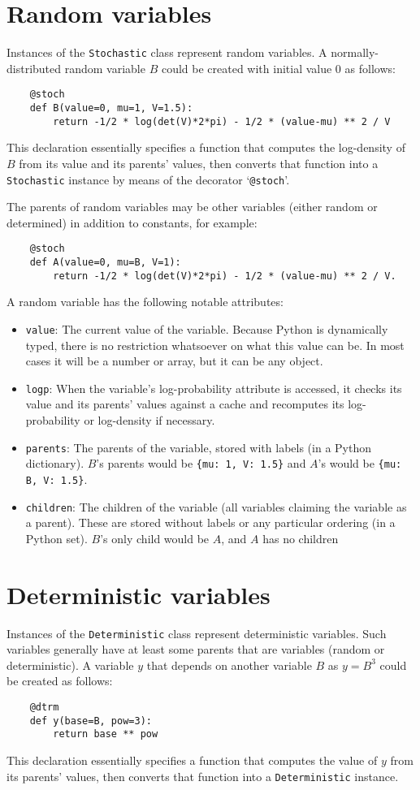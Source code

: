 \documentclass{report}
\begin{document}
\section{Random variables} 
Instances of the \texttt{Stochastic} class represent random variables. A normally-distributed random variable $B$ could be created with initial value 0 as follows:
\begin{verbatim}    
    @stoch
    def B(value=0, mu=1, V=1.5):
        return -1/2 * log(det(V)*2*pi) - 1/2 * (value-mu) ** 2 / V
\end{verbatim}
This declaration essentially specifies a function that computes the log-density of $B$ from its value and its parents' values, then converts that function into a \texttt{Stochastic} instance by means of the decorator `\texttt{@stoch}'.

The parents of random variables may be other variables (either random or determined) in addition to constants, for example:
\begin{verbatim}
    @stoch
    def A(value=0, mu=B, V=1):
        return -1/2 * log(det(V)*2*pi) - 1/2 * (value-mu) ** 2 / V.
\end{verbatim}


A random variable has the following notable attributes: 
\begin{itemize}
    \item \texttt{value}: The current value of the variable. Because Python is dynamically typed, there is no restriction whatsoever on what this value can be. In most cases it will be a number or array, but it can be any object.
    \item \texttt{logp}: When the variable's log-probability attribute is accessed, it checks its value and its parents' values against a cache and recomputes its log-probability or log-density if necessary.
    \item \texttt{parents}: The parents of the variable, stored with labels (in a Python dictionary). $B$'s parents would be \texttt{\{mu: 1, V: 1.5\}} and $A$'s would be \texttt{\{mu: B, V: 1.5\}}.
    \item \texttt{children}: The children of the variable (all variables claiming the variable as a parent). These are stored without labels or any particular ordering (in a Python set). $B$'s only child would be $A$, and $A$ has no children
\end{itemize}


\section{Deterministic variables}
Instances of the \texttt{Deterministic} class represent deterministic variables. Such variables generally have at least some parents that are variables (random or deterministic). A variable $y$ that depends on another variable $B$ as $y=B^3$ could be created as follows:
\begin{verbatim}
    @dtrm
    def y(base=B, pow=3):
        return base ** pow
\end{verbatim}
This declaration essentially specifies a function that computes the value of $y$ from its parents' values, then converts that function into a \texttt{Deterministic} instance.
\end{document}
